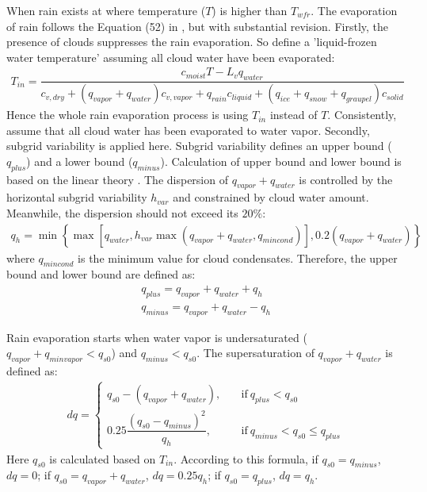 \documentclass[letterpaper,titlepage,10pt]{article}
\numberwithin{equation}{section}
\begin{document}
When rain exists at where temperature ($T$) is higher than $T_{wfr}$. The evaporation of rain follows the Equation (52) in \citet{lin1983bulk}, but with substantial revision. Firstly, the presence of clouds suppresses the rain evaporation. So define a 'liquid-frozen water temperature' assuming all cloud water have been evaporated:
\begin{gather}
	T_{in} = \dfrac{c_{moist} T - L_v q_{water}}{c_{v,dry} + \left(q_{vapor} + q_{water}\right) c_{v,vapor} + q_{rain} c_{liquid} + \left(q_{ice} + q_{snow} + q_{graupel} \right) c_{solid}}
\end{gather}
Hence the whole rain evaporation process is using $T_{in}$ instead of $T$. Consistently, assume that all cloud water has been evaporated to water vapor. Secondly, subgrid variability is applied here. Subgrid variability defines an upper bound ($q_{plus}$) and a lower bound ($q_{minus}$). Calculation of upper bound and lower bound is based on the linear theory \citep{lin1994acla}. The dispersion of $q_{vapor} + q_{water}$ is controlled by the horizontal subgrid variability $h_{var}$ and constrained by cloud water amount. Meanwhile, the dispersion should not exceed its $20\%$:
\begin{gather}
	q_h = \min \left\{\max \left[q_{water}, h_{var} \max \left(q_{vapor} + q_{water}, q_{mincond} \right) \right], 0.2 \left(q_{vapor} + q_{water} \right) \right\} \label{eqn:qh}
\end{gather}
where $q_{mincond}$ is the minimum value for cloud condensates. Therefore, the upper bound and lower bound are defined as:
\begin{gather}
	q_{plus} = q_{vapor} + q_{water} + q_h \\
	q_{minus} = q_{vapor} + q_{water} - q_h
\end{gather}

Rain evaporation starts when water vapor is undersaturated ($q_{vapor} + q_{minvapor} < q_{s0}$) and $q_{minus} < q_{s0}$. The supersaturation of $q_{vapor} + q_{water}$ is defined as:
\begin{align}
	dq = 
	\begin{cases}
		q_{s0} - \left(q_{vapor} + q_{water} \right), & \quad \text{if}\ q_{plus} < q_{s0} \\
		0.25 \dfrac{\left(q_{s0} - q_{minus} \right)^2}{q_h}, & \quad \text{if}\ q_{minus} < q_{s0} \leq q_{plus}
	\end{cases}
\end{align}
Here $q_{s0}$ is calculated based on $T_{in}$. According to this formula, if $q_{s0} = q_{minus}$, $dq = 0$; if $q_{s0} = q_{vapor} + q_{water}$, $dq = 0.25 q_h$; if $q_{s0} = q_{plus}$, $dq = q_h$.
\end{document}
